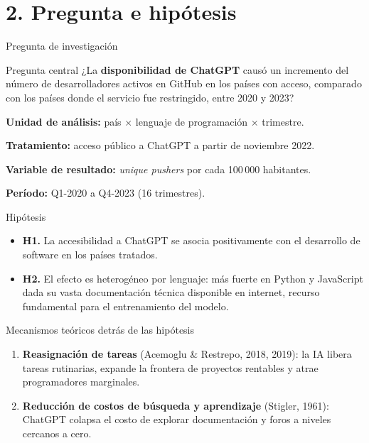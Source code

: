 \documentclass[10pt,aspectratio=169]{beamer}
\begin{document}
\section{2. Pregunta e hipótesis}

\begin{frame}{Pregunta de investigación}
\vfill
\begin{block}{Pregunta central}
\centering
¿La \textbf{disponibilidad de ChatGPT} causó un incremento del número de desarrolladores activos en GitHub en los países con acceso, comparado con los países donde el servicio fue restringido, entre 2020 y 2023?
\end{block}

\vfill
\textbf{Unidad de análisis:} país $\times$ lenguaje de programación $\times$ trimestre.

\textbf{Tratamiento:} acceso público a ChatGPT a partir de noviembre 2022.

\textbf{Variable de resultado:} \textit{unique pushers} por cada 100\,000 habitantes.

\textbf{Período:} Q1-2020 a Q4-2023 (16 trimestres).
\vfill
\end{frame}

\begin{frame}{Hipótesis}
\begin{itemize}
  \item \textbf{H1.} La accesibilidad a ChatGPT se asocia positivamente con el desarrollo de software en los países tratados.
  \item \textbf{H2.} El efecto es \alert{heterogéneo por lenguaje}: más fuerte en Python y JavaScript dada su vasta documentación técnica disponible en internet, recurso fundamental para el entrenamiento del modelo.
\end{itemize}

\vspace{1em}
\begin{block}{Mecanismos teóricos detrás de las hipótesis}
\begin{enumerate}
  \item \textbf{Reasignación de tareas} (Acemoglu \& Restrepo, 2018, 2019): la IA libera tareas rutinarias, expande la frontera de proyectos rentables y atrae programadores marginales.
  \item \textbf{Reducción de costos de búsqueda y aprendizaje} (Stigler, 1961): ChatGPT colapsa el costo de explorar documentación y foros a niveles cercanos a cero.
\end{enumerate}
\end{block}
\end{frame}
\end{document}
